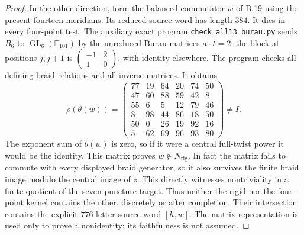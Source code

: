 \begin{proof}
In the other direction, form the balanced commutator $w$ of
B.19 using the present fourteen meridians.  Its reduced source
word has length $384$.  It dies in every four-point test.
The auxiliary exact program \texttt{check\_all13\_burau.py}
sends $B_6$ to $\operatorname{GL}_6(\mathbb F_{101})$ by the
unreduced Burau matrices at $t=2$: the block at positions
$j,j+1$ is
$\left(\begin{smallmatrix}-1&2\\1&0\end{smallmatrix}\right)$,
with identity elsewhere.  The program checks all defining
braid relations and all inverse matrices.  It obtains
\[
 \rho(\theta(w))=
 \begin{pmatrix}
 77&19&64&20&74&50\\
 47&60&88&59&42&8\\
 55&6&5&12&79&46\\
 8&98&44&86&18&50\\
 50&0&26&19&92&16\\
 5&62&69&96&93&80
 \end{pmatrix}\ne I.
\]
The exponent sum of $\theta(w)$ is zero, so if it were a
central full-twist power it would be the identity.  This
matrix proves $w\notin N_{\mathrm{rig}}$.  In fact the matrix
fails to commute with every displayed braid generator, so
it also survives the finite braid image modulo the central
image of $z$.  This directly witnesses nontriviality in a
finite quotient of the seven-puncture target.
Thus neither the rigid nor the four-point kernel contains
the other, discretely or after completion.  Their intersection
contains the explicit $776$-letter source word $[h,w]$.
The matrix representation is used only to prove a nonidentity;
its faithfulness is not assumed.
\end{proof}
